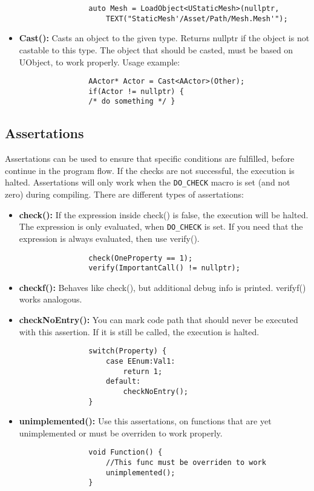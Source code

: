 \documentclass[10pt,a4paper]{article}
\begin{document}
\begin{multicols*}{2}
\begin{itemize}
			\begin{verbatim}
				auto Mesh = LoadObject<UStaticMesh>(nullptr,
				    TEXT("StaticMesh'/Asset/Path/Mesh.Mesh'");
			\end{verbatim}
			\item \textbf{Cast():} Casts an object to the given type. Returns nullptr if the object is not castable to this type. The object that should be casted, must be based on UObject, to work properly.
			Usage example:
			\begin{verbatim}
				AActor* Actor = Cast<AActor>(Other);
				if(Actor != nullptr) {
				/* do something */ }
			\end{verbatim}
	\end{itemize}

	\subsection{Assertations}
	Assertations can be used to ensure that specific conditions are fulfilled, before continue in the program flow. If the checks are not successful, the execution is halted. Assertations will only work when the \verb|DO_CHECK| macro is set (and not zero) during compiling.
	There are different types of assertations:
	\begin{itemize}
		\item \textbf{check():} If the expression inside check() is false, the execution will be halted. The expression is only evaluated, when \verb|DO_CHECK| is set. If you need that the expression is always evaluated, then use verify().
			\begin{verbatim}
				check(OneProperty == 1);
				verify(ImportantCall() != nullptr);
			\end{verbatim}
		\item \textbf{checkf():} Behaves like check(), but additional debug info is printed. verifyf() works analogous.
		\item \textbf{checkNoEntry():} You can mark code path that should never be executed with this assertion. If it is still be called, the execution is halted.
			\begin{verbatim}
				switch(Property) {
				    case EEnum:Val1:
				        return 1;
				    default:
				        checkNoEntry();
				}
			\end{verbatim}
		\item \textbf{unimplemented():} Use this assertations, on functions that are yet unimplemented or must be overriden to work properly.
			\begin{verbatim}
				void Function() {
				    //This func must be overriden to work
				    unimplemented();   
				}
			\end{verbatim}
	\end{itemize}
	
	\doclicenseImage
\end{multicols*}
\end{document}
